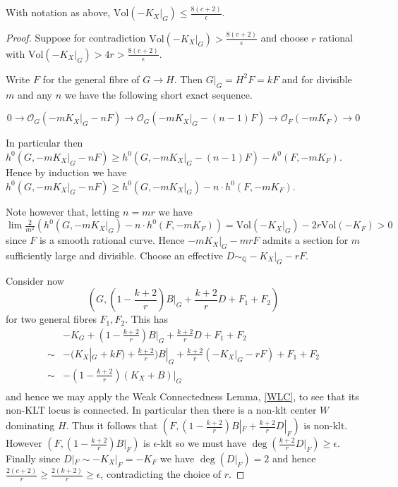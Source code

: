 \documentclass[a4paper,12pt]{book}
\newcommand{\Vol}{\text{Vol}}
\begin{document}
\begin{lemma}\cite[Lemma 6.5]{jiang2014boundedness}
	With notation as above, $\Vol(-K_{X}|_{G}) \leq \frac{8(c+2)}{\epsilon}$. 
\end{lemma}
\begin{proof}
	Suppose for contradiction $\Vol(-K_{X}|_{G}) >\frac{8(c+2)}{\epsilon}$ and choose $r$ rational with $\Vol(-K_{X}|_{G}) > 4r >\frac{8(c+2)}{\epsilon}$.
	
	Write $F$ for the general fibre of $G \to H$. Then $G|_{G}=H^{2}F=kF$ and for divisible $m$ and any $n$ we have the following short exact sequence.
	
	\[0 \to \mathcal{O}_{G}(-mK_{X}|_{G}-nF) \to \mathcal{O}_{G}(-mK_{X}|_{G}-(n-1)F) \to \mathcal{O}_{F}(-mK_{F}) \to 0\]
	
	In particular then $h^{0}(G,-mK_{X}|_{G}-nF) \geq h^{0}(G,-mK_{X}|_{G}-(n-1)F)-h^{0}(F,-mK_{F})$.
	Hence by induction we have $h^{0}(G,-mK_{X}|_{G}-nF) \geq h^{0}(G,-mK_{X}|_{G})-n\cdot h^{0}(F,-mK_{F})$.
	
	Note however that, letting $n=mr$ we have $\lim \frac{2}{m^{2}}(h^{0}(G,-mK_{X}|_{G})-n\cdot h^{0}(F,-mK_{F}))= \Vol(-K_{X}|_{G})-2r\Vol(-K_{F}) > 0$ since $F$ is a smooth rational curve. Hence $-mK_{X}|_{G}-mrF$ admits a section for $m$ sufficiently large and divisible. Choose an effective $D\sim_{\mathbb{Q}} -K_{X}|_{G}-rF$.
	
	Consider now \[(G,(1-\frac{k+2}{r})B|_{G}+\frac{k+2}{r}D+F_{1}+F_{2})\]
	for two general fibres $F_{1}, F_{2}$.
	This has \begin{align*}
	&-K_{G}+(1-\frac{k+2}{r})B|_{G}+\frac{k+2}{r}D+F_{1}+F_{2}	\\
	\sim & -(K_{X}|_{G}+kF)+\frac{k+2}{r})B|_{G}+\frac{k+2}{r}(-K_{X}|_{G}-rF)+F_{1}+F_{2} \\	
	\sim & -(1-\frac{k+2}{r})(K_{X}+B)|_{G} \\
	\end{align*}
	and hence we may apply the Weak Connectedness Lemma, \autoref{WLC}, to see that its non-KLT locus is connected. In particular then there is a non-klt center $W$ dominating $H$. Thus it follows that $(F,(1-\frac{k+2}{r})B|_{F}+\frac{k+2}{r}D|_{F})$ is non-klt. However $(F,(1-\frac{k+2}{r})B|_{F})$ is $\epsilon$-klt so we must have $\deg (\frac{k+2}{r}D|_{F})\geq \epsilon$. Finally since $D|_{F}\sim -K_{X}|_{F}=-K_{F}$ we have $\deg(D|_{F})=2$ and hence $\frac{2(c+2)}{r} \geq \frac{2(k+2)}{r} \geq \epsilon$, contradicting the choice of $r$.
\end{proof}
\end{document}
